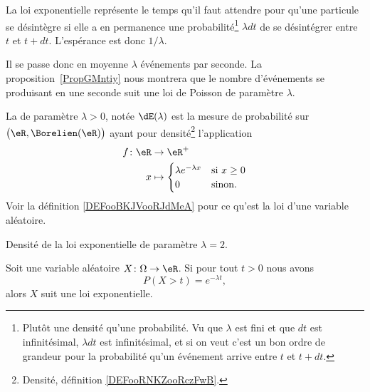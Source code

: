 La loi exponentielle représente le temps qu'il faut attendre pour qu'une particule se désintègre si elle a en permanence une probabilité\footnote{Plutôt une densité qu'une probabilité. Vu que \( \lambda\) est fini et que \( dt\) est infinitésimal, \( \lambda dt\) est infinitésimal, et si on veut c'est un bon ordre de grandeur pour la probabilité qu'un événement arrive entre \( t\) et \( t+dt\).} \( \lambda dt\) de se désintégrer entre \( t\) et \( t+dt\). L'espérance est donc \( 1/\lambda\).

Il se passe donc en moyenne \( \lambda\) événements par seconde. La proposition~\ref{PropGMntiy} nous montrera que le nombre d'événements se produisant en une seconde suit une loi de Poisson de paramètre \( \lambda\).

\begin{definition}       \label{DEFooTSFNooULWNHY}
	La  de paramètre \( \lambda>0\), notée \( \dE(\lambda)\) est la mesure de probabilité sur \( \big( \eR,\Borelien(\eR) \big)   \) ayant pour densité\footnote{Densité, définition \ref{DEFooRNKZooRczFwB}.} l'application
	\begin{equation}
		\begin{aligned}
			f\colon \eR & \to \eR^+ \\
			x           & \mapsto
			\begin{cases}
				\lambda e^{-\lambda x} & \text{si } x\geq 0 \\
				0                      & \text{sinon}.
			\end{cases}
		\end{aligned}
	\end{equation}
	Voir la définition \ref{DEFooBKJVooRJdMeA} pour ce qu'est la loi d'une variable aléatoire.
\end{definition}

Densité de la loi exponentielle de paramètre \( \lambda=2\).

\begin{center}
	
\end{center}

\begin{proposition}	\label{PROPooKLJIooUFfGwa}
	Soit une variable aléatoire \(X \colon \Omega\to \eR  \). Si pour tout \( t>0\) nous avons
	\begin{equation}
		P(X>t)=e^{-\lambda t},
	\end{equation}
	alors \( X\) suit une loi exponentielle.
\end{proposition}

